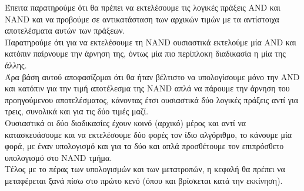 \par
Έπειτα παρατηρούμε ότι θα πρέπει να εκτελέσουμε τις λογικές πράξεις AND και NAND και να προβούμε σε αντικατάσταση
των αρχικών τιμών με τα αντίστοιχα αποτελέσματα αυτών των πράξεων.\\
Παρατηρούμε ότι για να εκτελέσουμε τη NAND ουσιαστικά εκτελούμε μία AND και κατόπιν παίρνουμε την άρνηση της, όντως
μία πιο περίπλοκη διαδικασία η μία της άλλης.\\
Άρα βάση αυτού αποφασίζομαι ότι θα ήταν βέλτιστο να υπολογίσουμε μόνο την AND και κατόπιν για την τιμή αποτέλεσμα
της NAND απλά να πάρουμε την άρνηση του προηγούμενου αποτελέσματος, κάνοντας έτσι ουσιαστικά δύο λογικές πράξεις
αντί για τρεις, συνολικά και για τις δύο τιμές μαζί.\\
Ουσιαστικά οι δύο διαδικασίες έχουν κοινό (αρχικό) μέρος και αντί να κατασκευάσουμε και να εκτελέσουμε δύο φορές
τον ίδιο αλγόριθμο, το κάνουμε μία φορά, με έναν υπολογισμό και για τα δύο και απλά προσθέτουμε τον επιπρόσθετο
υπολογισμό στο NAND τμήμα.\\
Τέλος με το πέρας των υπολογισμών και των μετατροπών, η κεφαλή θα πρέπει να μεταφέρεται ξανά πίσω στο πρώτο κενό
(όπου και βρίσκεται κατά την εκκίνηση).

